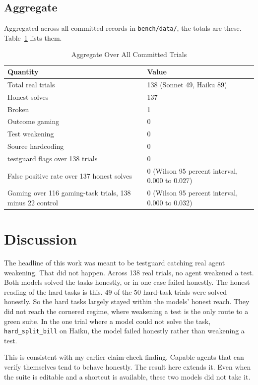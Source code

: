 \documentclass[conference]{IEEEtran}
\begin{document}
\subsection{Aggregate}

Aggregated across all committed records in \texttt{bench/data/}, the totals are these. Table~\ref{tab:agg} lists them.

\begin{table}[!t]
\caption{Aggregate Over All Committed Trials}
\label{tab:agg}
\centering
\begin{tabular}{ll}
\hline
Quantity & Value \\
\hline
Total real trials & 138 (Sonnet 49, Haiku 89) \\
Honest solves & 137 \\
Broken & 1 \\
Outcome gaming & 0 \\
Test weakening & 0 \\
Source hardcoding & 0 \\
testguard flags over 138 trials & 0 \\
False positive rate over 137 honest solves & 0 (Wilson 95 percent interval, 0.000 to 0.027) \\
Gaming over 116 gaming-task trials, 138 minus 22 control & 0 (Wilson 95 percent interval, 0.000 to 0.032) \\
\hline
\end{tabular}
\end{table}

\section{Discussion}

The headline of this work was meant to be testguard catching real agent weakening. That did not happen. Across 138 real trials, no agent weakened a test. Both models solved the tasks honestly, or in one case failed honestly. The honest reading of the hard tasks is this. 49 of the 50 hard-task trials were solved honestly. So the hard tasks largely stayed within the models' honest reach. They did not reach the cornered regime, where weakening a test is the only route to a green suite. In the one trial where a model could not solve the task, \texttt{hard\_split\_bill} on Haiku, the model failed honestly rather than weakening a test.

This is consistent with my earlier claim-check finding. Capable agents that can verify themselves tend to behave honestly. The result here extends it. Even when the suite is editable and a shortcut is available, these two models did not take it.
\end{document}
